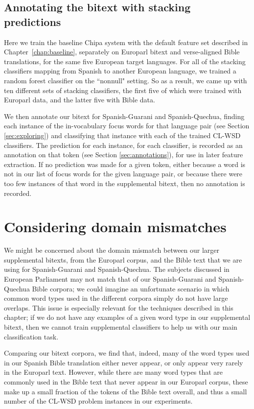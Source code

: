 \subsection{Annotating the bitext with stacking predictions}
Here we train the baseline Chipa system with the default feature set described
in Chapter~\ref{chap:baseline}, separately on Europarl bitext and verse-aligned
Bible translations, for the same five European target languages. For all of
the stacking classifiers mapping from Spanish to another European language, we
trained a random forest classifier on the ``nonnull" setting. So as a result,
we came up with ten different sets of stacking classifiers, the first five of
which were trained with Europarl data, and the latter five with Bible data.

We then annotate our bitext for Spanish-Guarani and Spanish-Quechua, finding
each instance of the in-vocabulary focus words for that language pair (see
Section \ref{sec:exploring}) and classifying that instance with each of the
trained CL-WSD classifiers. The prediction for each instance, for each
classifier, is recorded as an annotation on that token (see Section
\ref{sec:annotations}), for use in later feature extraction. If no prediction
was made for a given token, either because a word is not in our list of focus
words for the given language pair, or because there were too few instances of
that word in the supplemental bitext, then no annotation is recorded.

\section{Considering domain mismatches}
\label{sec:domainmismatches}
We might be concerned about the domain mismatch between our larger supplemental
bitexts, from the Europarl corpus, and the Bible text that we are using for
Spanish-Guarani and Spanish-Quechua.
The subjects discussed in European Parliament may not match that of our
Spanish-Guarani and Spanish-Quechua Bible corpora; we could imagine an
unfortunate scenario in which common word types used in the different corpora
simply do not have large overlaps.
This issue is especially relevant for the techniques described in this chapter;
if we do not have any examples of a given word type in our supplemental bitext,
then we cannot train supplemental classifiers to help us with our main
classification task.

Comparing our bitext corpora, we find that, indeed, many of the word types used
in our Spanish Bible translation either never appear, or only appear very
rarely in the Europarl text. However, while there are many word types that are
commonly used in the Bible text that never appear in our Europarl corpus, these
make up a small fraction of the tokens of the Bible text overall, and thus a
small number of the CL-WSD problem instances in our experiments.

